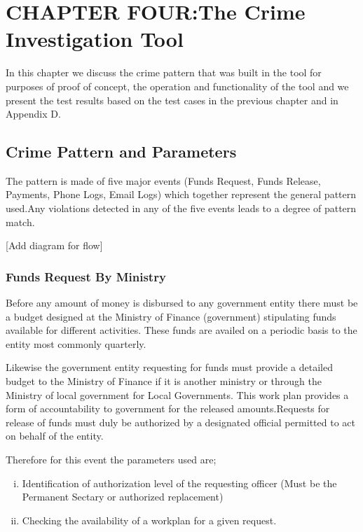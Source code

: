 
\section{CHAPTER FOUR:The Crime Investigation Tool}

\noindent In this chapter we discuss the crime pattern that was built in the tool for purposes of proof of concept, the operation and functionality of the tool and we present the test results based on the test cases in the previous chapter and  in Appendix D.


\subsection{Crime Pattern and Parameters}

\noindent The pattern is made of five major events (Funds Request, Funds Release, Payments, Phone Logs, Email Logs) which together represent the general pattern used.Any violations detected in any of the five events leads to a degree of pattern match.

[Add diagram for flow]

\subsubsection{Funds Request By Ministry}

\noindent Before any amount of money is disbursed to any government entity there must be a budget designed at the Ministry of Finance (government) stipulating funds available for different activities. These funds are availed on a periodic basis to the entity most commonly quarterly.

\noindent Likewise the government entity requesting for funds must provide a detailed budget to the Ministry of Finance if it is another ministry or through the Ministry of local government for Local Governments. This work plan provides a form of accountability to government for the released amounts.Requests for release of funds must duly be authorized by a designated official permitted to act on behalf of the entity.

\noindent Therefore for this event the parameters used are;

\begin{enumerate}[(i)]
\item Identification of authorization level of the requesting officer (Must be the Permanent Sectary or authorized replacement)
\item Checking the availability of a workplan for a given request. 
\end{enumerate}

